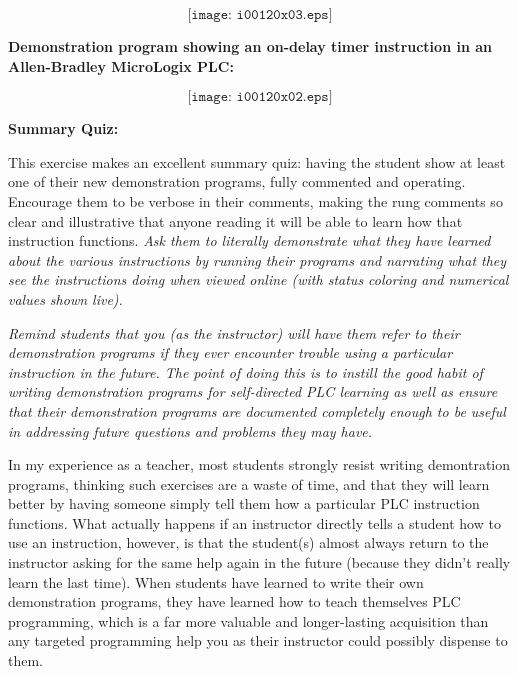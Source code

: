 $$\texttt{[image: i00120x03.eps]}$$


\filbreak

\noindent
{\bf Demonstration program showing an on-delay timer instruction in an Allen-Bradley MicroLogix PLC:}

$$\texttt{[image: i00120x02.eps]}$$







\vfil \eject

\noindent
{\bf Summary Quiz:}

This exercise makes an excellent summary quiz: having the student show at least one of their new demonstration programs, fully commented and operating.  Encourage them to be verbose in their comments, making the rung comments so clear and illustrative that anyone reading it will be able to learn how that instruction functions.  {\it Ask them to literally demonstrate what they have learned about the various instructions by running their programs and narrating what they see the instructions doing when viewed online (with status coloring and numerical values shown live).}

\vskip 10pt

{\it Remind students that you (as the instructor) will have them refer to their demonstration programs if they ever encounter trouble using a particular instruction in the future.  The point of doing this is to instill the good habit of writing demonstration programs for self-directed PLC learning as well as ensure that their demonstration programs are documented completely enough to be useful in addressing future questions and problems they may have.}

\vskip 10pt

In my experience as a teacher, most students strongly resist writing demontration programs, thinking such exercises are a waste of time, and that they will learn better by having someone simply tell them how a particular PLC instruction functions.  What actually happens if an instructor directly tells a student how to use an instruction, however, is that the student(s) almost always return to the instructor asking for the same help again in the future (because they didn't really learn the last time).  When students have learned to write their own demonstration programs, they have learned how to teach themselves PLC programming, which is a far more valuable and longer-lasting acquisition than any targeted programming help you as their instructor could possibly dispense to them.






